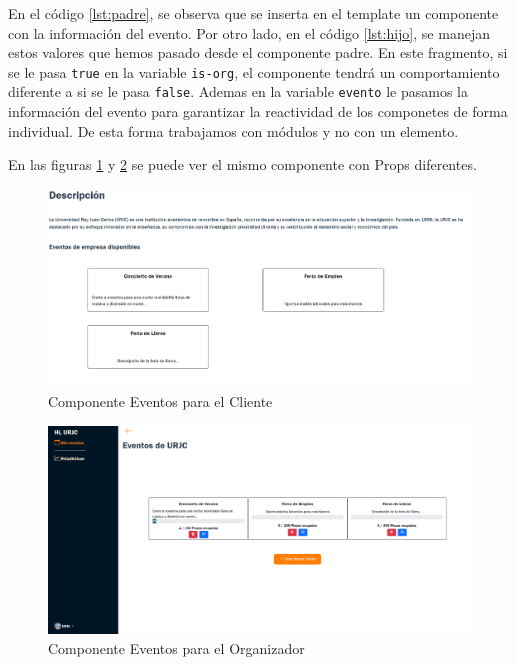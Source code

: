 En el código \ref{lst:padre}, se observa que se inserta en el template un componente con la información del evento. Por otro lado, en el código 
\ref{lst:hijo}, se manejan estos valores que hemos pasado desde el componente padre. En este fragmento, si se le pasa \texttt{true} en la variable 
\texttt{is-org}, el componente tendrá un comportamiento diferente a si se le pasa \texttt{false}. Ademas en la variable \texttt{evento} le pasamos la información
del evento para garantizar la reactividad de los componetes de forma individual. De esta forma trabajamos con módulos y no con un elemento.

\newpage
En las figuras \ref{fig:eventosCli} y \ref{fig:orgMain}  se puede ver el mismo componente con Props diferentes.
\begin{figure}[h]
    \centering
    \includegraphics[width=1\textwidth]{eventosCli.png} 
    \caption{Componente Eventos para el Cliente}
    \label{fig:eventosCli}
\end{figure}

\begin{figure}[h]
    \centering
    \includegraphics[width=1\textwidth]{orgMain.png} 
    \caption{Componente Eventos para el Organizador}
    \label{fig:orgMain}
\end{figure}


